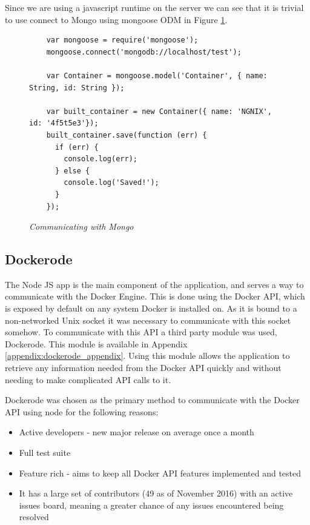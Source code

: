 Since we are using a javascript runtime on the server we can see that it is trivial to use connect to Mongo using mongoose ODM in Figure \ref{fig:mongo}.

\begin{figure}[!ht]
\begin{lstlisting}
	var mongoose = require('mongoose');
	mongoose.connect('mongodb://localhost/test');

	var Container = mongoose.model('Container', { name: String, id: String });

	var built_container = new Container({ name: 'NGNIX', id: '4f5t5e3'});
	built_container.save(function (err) {
	  if (err) {
	    console.log(err);
	  } else {
	    console.log('Saved!');
	  }
	});
\end{lstlisting}
\caption{\em Communicating with Mongo}
\label{fig:mongo}
\end{figure}

\subsection{Dockerode}
\label{sub:dockerode}

The Node JS app is the main component of the application, and serves a way to communicate with the Docker Engine. This is done using the Docker \gls{API}, which is exposed by default on any system Docker is installed on. As it is bound to a non-networked Unix socket it was necessary to communicate with this socket somehow. To communicate with this API a third party module was used, Dockerode. This module is available in Appendix \ref{appendix:dockerode_appendix}. Using this module allows the application to retrieve any information needed from the Docker API quickly and without needing to make complicated \gls{API} calls to it. 

Dockerode was chosen as the primary method to communicate with the Docker API using node for the following reasons:

\begin{itemize}
	\item Active developers - new major release on average once a month
	\item Full test suite
	\item Feature rich - aims to keep all Docker API features implemented and tested
	\item It has a large set of contributors (49 as of November 2016) with an active issues board, meaning a greater chance of any issues encountered being resolved
\end{itemize}

